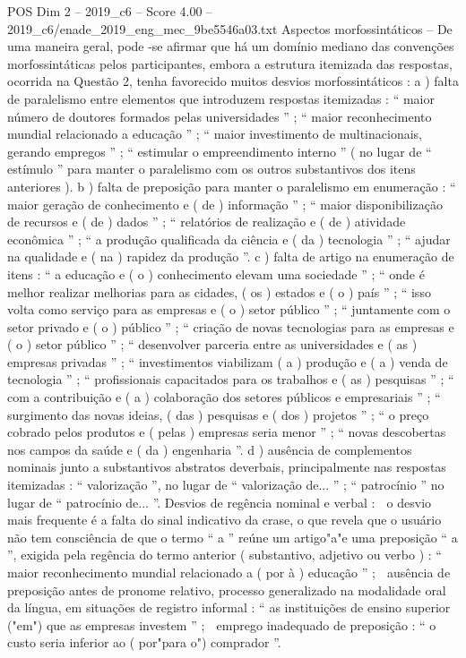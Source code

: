 \begin{textsample}{POS Dim 2 – 2019\_c6 – Score 4.00 – 2019\_c6/enade\_2019\_eng\_mec\_9be5546a03.txt}
Aspectos morfossintáticos – De uma maneira geral, pode -se afirmar que há um domínio mediano das convenções morfossintáticas pelos participantes, embora a estrutura itemizada das respostas, ocorrida na Questão 2, tenha favorecido muitos desvios morfossintáticos : a ) falta de paralelismo entre elementos que introduzem respostas itemizadas : “ maior número de doutores formados pelas universidades ” ; “ maior reconhecimento mundial relacionado a educação ” ; “ maior investimento de multinacionais, gerando empregos ” ; “ estimular o empreendimento interno ” ( no lugar de “ estímulo ” para manter o paralelismo com os outros substantivos dos itens anteriores ). b ) falta de preposição para manter o paralelismo em enumeração : “ maior geração de conhecimento e ( de ) informação ” ; “ maior disponibilização de recursos e ( de ) dados ” ; “ relatórios de realização e ( de ) atividade econômica ” ; “ a produção qualificada da ciência e ( da ) tecnologia ” ; “ ajudar na qualidade e ( na ) rapidez da produção ”. c ) falta de artigo na enumeração de itens : “ a educação e ( o ) conhecimento elevam uma sociedade ” ; “ onde é melhor realizar melhorias para as cidades, ( os ) estados e ( o ) país ” ; “ isso volta como serviço para as empresas e ( o ) setor público ” ; “ juntamente com o setor privado e ( o ) público ” ; “ criação de novas tecnologias para as empresas e ( o ) setor público ” ; “ desenvolver parceria entre as universidades e ( as ) empresas privadas ” ; “ investimentos viabilizam ( a ) produção e ( a ) venda de tecnologia ” ; “ profissionais capacitados para os trabalhos e ( as ) pesquisas ” ; “ com a contribuição e ( a ) colaboração dos setores públicos e empresariais ” ; “ surgimento das novas ideias, ( das ) pesquisas e ( dos ) projetos ” ; “ o preço cobrado pelos produtos e ( pelas ) empresas seria menor ” ; “ novas descobertas nos campos da saúde e ( da ) engenharia ”. d ) ausência de complementos nominais junto a substantivos abstratos deverbais, principalmente nas respostas itemizadas : “ valorização ”, no lugar de “ valorização de... ” ; “ patrocínio ” no lugar de “ patrocínio de... ”.
Desvios de regência nominal e verbal :  o desvio mais frequente é a falta do sinal indicativo da crase, o que revela que o usuário não tem consciência de que o termo “ a ” reúne um artigo"a"e uma preposição “ a ”, exigida pela regência do termo anterior ( substantivo, adjetivo ou verbo ) : “ maior reconhecimento mundial relacionado a ( por à ) educação ” ;  ausência de preposição antes de pronome relativo, processo generalizado na modalidade oral da língua, em situações de registro informal : “ as instituições de ensino superior ("em") que as empresas investem ” ;  emprego inadequado de preposição : “ o custo seria inferior ao ( por"para o") comprador ”.

\end{textsample}

